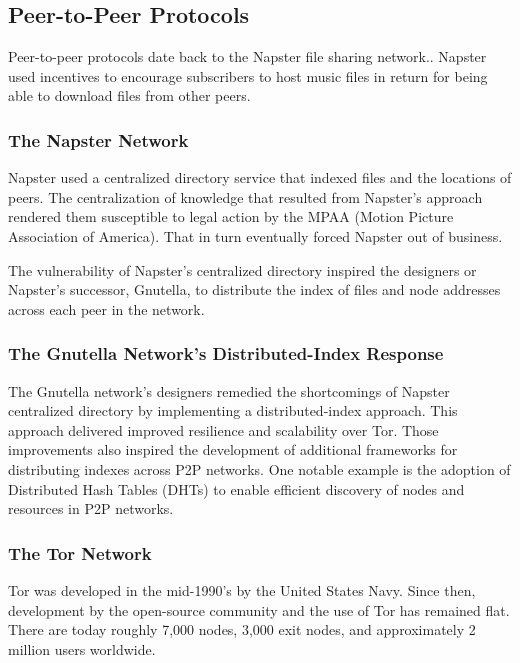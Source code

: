 \subsection{Peer-to-Peer Protocols}
Peer-to-peer protocols date back to the Napster file sharing network.\cite{42}. Napster used incentives to encourage subscribers to host music files in return for being able to download files from other peers.

\subsubsection{The Napster Network}
Napster used a centralized directory service that indexed files and the locations of peers. The centralization of knowledge that resulted from Napster's approach rendered them susceptible to legal action by the MPAA (Motion Picture Association of America). That in turn eventually forced Napster out of business.

The vulnerability of Napster's centralized directory inspired the designers or Napster's successor, Gnutella, to  distribute the index of files and node addresses across each peer in the network\cite{43}.

\subsubsection{The Gnutella Network's Distributed-Index Response}
The Gnutella network's designers remedied the shortcomings of Napster centralized directory by implementing a distributed-index approach. This approach delivered improved resilience and scalability over Tor. Those improvements also inspired the development of additional frameworks for distributing indexes across P2P networks. One notable example is the adoption of Distributed Hash Tables (DHTs) to enable efficient discovery of nodes and resources in P2P networks.

\subsubsection{The Tor Network}
\label{subsec: tornetwork}

Tor was developed in the mid-1990’s by the United States Navy. Since then, development by the open-source community and the use of Tor has remained flat. There are today roughly 7,000 nodes, 3,000 exit nodes, and approximately 2 million users worldwide.


